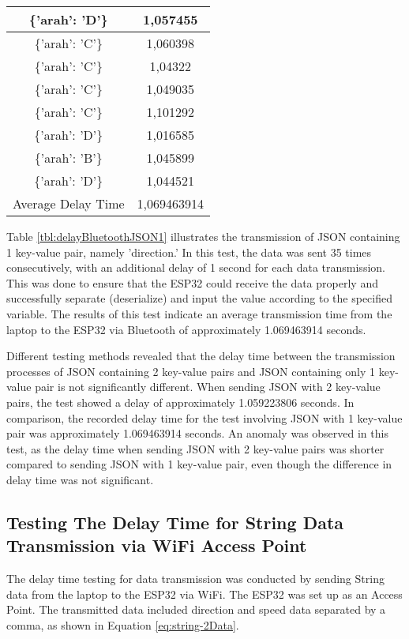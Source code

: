\begin{table}[!h]
\begin{tabular}{|c|c|}
  \{'arah': 'D'\}    & 1,057455    \\ \hline
  \{'arah': 'C'\}    & 1,060398    \\ \hline
  \{'arah': 'C'\}    & 1,04322     \\ \hline
  \{'arah': 'C'\}    & 1,049035    \\ \hline
  \{'arah': 'C'\}    & 1,101292    \\ \hline
  \{'arah': 'D'\}    & 1,016585    \\ \hline
  \{'arah': 'B'\}    & 1,045899    \\ \hline
  \{'arah': 'D'\}    & 1,044521    \\ \hline
  Average Delay Time & 1,069463914 \\ \hline
  \end{tabular}
\end{table}

Table \ref{tbl:delayBluetoothJSON1} illustrates the transmission of JSON containing 1 key-value pair, namely 'direction.' In this test, the data was sent 35 times consecutively, with an additional delay of 1 second for each data transmission. This was done to ensure that the ESP32 could receive the data properly and successfully separate (deserialize) and input the value according to the specified variable. The results of this test indicate an average transmission time from the laptop to the ESP32 via Bluetooth of approximately 1.069463914 seconds.

Different testing methods revealed that the delay time between the transmission processes of JSON containing 2 key-value pairs and JSON containing only 1 key-value pair is not significantly different. When sending JSON with 2 key-value pairs, the test showed a delay of approximately 1.059223806 seconds. In comparison, the recorded delay time for the test involving JSON with 1 key-value pair was approximately 1.069463914 seconds. An anomaly was observed in this test, as the delay time when sending JSON with 2 key-value pairs was shorter compared to sending JSON with 1 key-value pair, even though the difference in delay time was not significant.

\subsection{Testing The Delay Time for String Data Transmission via WiFi Access Point}

The delay time testing for data transmission was conducted by sending String data from the laptop to the ESP32 via WiFi. The ESP32 was set up as an Access Point. The transmitted data included direction and speed data separated by a comma, as shown in Equation \ref{eq:string-2Data}.

